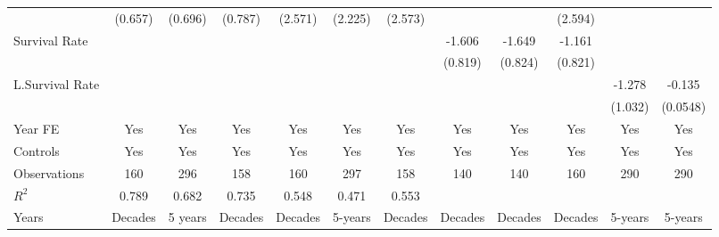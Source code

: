 \begin{table}[htbp]
\begin{tabular}{l*{11}{c}}
                &  (0.657)         &  (0.696)         &  (0.787)         &  (2.571)         &  (2.225)         &  (2.573)         &                  &                  &  (2.594)         &                  &                  \\
\addlinespace
Survival Rate   &                  &                  &                  &                  &                  &                  &   -1.606\sym{*}  &   -1.649\sym{*}  &   -1.161         &                  &                  \\
                &                  &                  &                  &                  &                  &                  &  (0.819)         &  (0.824)         &  (0.821)         &                  &                  \\
\addlinespace
L.Survival Rate &                  &                  &                  &                  &                  &                  &                  &                  &                  &   -1.278         &   -0.135\sym{*}  \\
                &                  &                  &                  &                  &                  &                  &                  &                  &                  &  (1.032)         & (0.0548)         \\
\addlinespace
Year FE         &      Yes         &      Yes         &      Yes         &      Yes         &      Yes         &      Yes         &      Yes         &      Yes         &      Yes         &      Yes         &      Yes         \\
\addlinespace
Controls        &      Yes         &      Yes         &      Yes         &      Yes         &      Yes         &      Yes         &      Yes         &      Yes         &      Yes         &      Yes         &      Yes         \\
\midrule
Observations    &      160         &      296         &      158         &      160         &      297         &      158         &      140         &      140         &      160         &      290         &      290         \\
\(R^{2}\)       &    0.789         &    0.682         &    0.735         &    0.548         &    0.471         &    0.553         &                  &                  &                  &                  &                  \\
Years           &  Decades         &  5 years         &  Decades         &  Decades         &  5-years         &  Decades         &  Decades         &  Decades         &  Decades         &  5-years         &  5-years         \\

\end{tabular}
\end{table}
